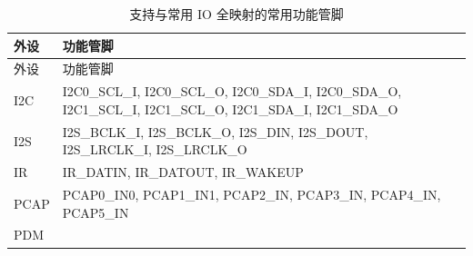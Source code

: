 \documentclass[
  12pt,
]{book}
\begin{document}
\begin{longtable}[]{@{}ll@{}}
\caption{\label{tab:ch-pinctrl-common-set} 支持与常用 IO 全映射的常用功能管脚}\tabularnewline
\toprule
\begin{minipage}[b]{0.09\columnwidth}\raggedright
外设\strut
\end{minipage} & \begin{minipage}[b]{0.85\columnwidth}\raggedright
功能管脚\strut
\end{minipage}\tabularnewline
\midrule
\endfirsthead
\toprule
\begin{minipage}[b]{0.09\columnwidth}\raggedright
外设\strut
\end{minipage} & \begin{minipage}[b]{0.85\columnwidth}\raggedright
功能管脚\strut
\end{minipage}\tabularnewline
\midrule
\endhead
\begin{minipage}[t]{0.09\columnwidth}\raggedright
I2C\strut
\end{minipage} & \begin{minipage}[t]{0.85\columnwidth}\raggedright
I2C0\_SCL\_I, I2C0\_SCL\_O, I2C0\_SDA\_I, I2C0\_SDA\_O, I2C1\_SCL\_I, I2C1\_SCL\_O, I2C1\_SDA\_I, I2C1\_SDA\_O\strut
\end{minipage}\tabularnewline
\begin{minipage}[t]{0.09\columnwidth}\raggedright
I2S\strut
\end{minipage} & \begin{minipage}[t]{0.85\columnwidth}\raggedright
I2S\_BCLK\_I, I2S\_BCLK\_O, I2S\_DIN, I2S\_DOUT, I2S\_LRCLK\_I, I2S\_LRCLK\_O\strut
\end{minipage}\tabularnewline
\begin{minipage}[t]{0.09\columnwidth}\raggedright
IR\strut
\end{minipage} & \begin{minipage}[t]{0.85\columnwidth}\raggedright
IR\_DATIN, IR\_DATOUT, IR\_WAKEUP\strut
\end{minipage}\tabularnewline
\begin{minipage}[t]{0.09\columnwidth}\raggedright
PCAP\strut
\end{minipage} & \begin{minipage}[t]{0.85\columnwidth}\raggedright
PCAP0\_IN0, PCAP1\_IN1, PCAP2\_IN, PCAP3\_IN, PCAP4\_IN, PCAP5\_IN\strut
\end{minipage}\tabularnewline
\begin{minipage}[t]{0.09\columnwidth}\raggedright
PDM\strut
\end{minipage} & \begin{minipage}[t]{0.85\columnwidth}\raggedright

\end{minipage}
\end{longtable}
\end{document}

